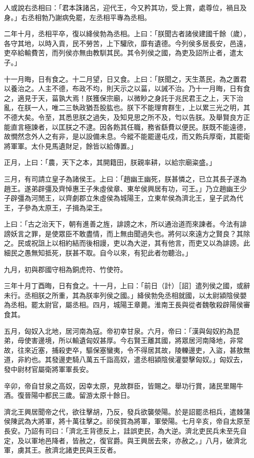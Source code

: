 \begin{pinyinscope}
人或說右丞相曰：「君本誅諸呂，迎代王，今又矜其功，受上賞，處尊位，禍且及身。」右丞相勃乃謝病免罷，左丞相平專為丞相。

二年十月，丞相平卒，復以絳侯勃為丞相。上曰：「朕聞古者諸侯建國千餘（歲），各守其地，以時入貢，民不勞苦，上下驩欣，靡有遺德。今列侯多居長安，邑遠，吏卒給輸費苦，而列侯亦無由教馴其民。其令列侯之國，為吏及詔所止者，遣太子。」

十一月晦，日有食之。十二月望，日又食。上曰：「朕聞之，天生蒸民，為之置君以養治之。人主不德，布政不均，則天示之以菑，以誡不治。乃十一月晦，日有食之，適見于天，菑孰大焉！朕獲保宗廟，以微眇之身託于兆民君王之上，天下治亂，在朕一人，唯二三執政猶吾股肱也。朕下不能理育群生，上以累三光之明，其不德大矣。令至，其悉思朕之過失，及知見思之所不及，匄以告朕。及舉賢良方正能直言極諫者，以匡朕之不逮。因各飭其任職，務省繇費以便民。朕既不能遠德，故憪然念外人之有非，是以設備未息。今縱不能罷邊屯戍，而又飭兵厚衛，其罷衛將軍軍。太仆見馬遺財足，餘皆以給傳置。」

正月，上曰：「農，天下之本，其開籍田，朕親率耕，以給宗廟粢盛。」

三月，有司請立皇子為諸侯王。上曰：「趙幽王幽死，朕甚憐之，已立其長子遂為趙王。遂弟辟彊及齊悼惠王子朱虛侯章、東牟侯興居有功，可王。」乃立趙幽王少子辟彊為河閒王，以齊劇郡立朱虛侯為城陽王，立東牟侯為濟北王，皇子武為代王，子參為太原王，子揖為梁王。

上曰：「古之治天下，朝有進善之旌，誹謗之木，所以通治道而來諫者。今法有誹謗妖言之罪，是使眾臣不敢盡情，而上無由聞過失也。將何以來遠方之賢良？其除之。民或祝詛上以相約結而後相謾，吏以為大逆，其有他言，而吏又以為誹謗。此細民之愚無知抵死，朕甚不取。自今以來，有犯此者勿聽治。」

九月，初與郡國守相為銅虎符、竹使符。

三年十月丁酉晦，日有食之。十一月，上曰：「前日（計）［詔］遣列侯之國，或辭未行。丞相朕之所重，其為朕率列侯之國。」絳侯勃免丞相就國，以太尉潁陰侯嬰為丞相。罷太尉官，屬丞相。四月，城陽王章薨。淮南王長與從者魏敬殺辟陽侯審食其。

五月，匈奴入北地，居河南為寇。帝初幸甘泉。六月，帝曰：「漢與匈奴約為昆弟，毋使害邊境，所以輸遺匈奴甚厚。今右賢王離其國，將眾居河南降地，非常故，往來近塞，捕殺吏卒，驅保塞蠻夷，令不得居其故，陵轢邊吏，入盜，甚敖無道，非約也。其發邊吏騎八萬五千詣高奴，遣丞相潁陰侯灌嬰擊匈奴。」匈奴去，發中尉材官屬衛將軍軍長安。

辛卯，帝自甘泉之高奴，因幸太原，見故群臣，皆賜之。舉功行賞，諸民里賜牛酒。復晉陽中都民三歲。留游太原十餘日。

濟北王興居聞帝之代，欲往擊胡，乃反，發兵欲襲滎陽。於是詔罷丞相兵，遣棘蒲侯陳武為大將軍，將十萬往擊之。祁侯賀為將軍，軍滎陽。七月辛亥，帝自太原至長安。乃詔有司曰：「濟北王背德反上，詿誤吏民，為大逆。濟北吏民兵未至先自定，及以軍地邑降者，皆赦之，復官爵。與王興居去來，亦赦之。」八月，破濟北軍，虜其王。赦濟北諸吏民與王反者。


\end{pinyinscope}
